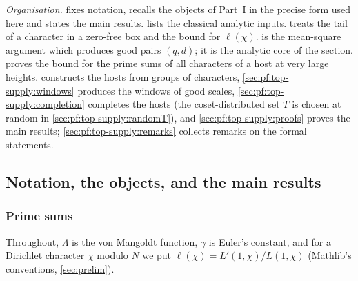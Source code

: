 \smallskip\noindent\emph{Organisation.}  fixes notation, recalls the objects of
Part~I in the precise form used here and states the main results.  lists the
classical analytic inputs.  treats the tail of a character in a zero-free box and the
bound for $\ell(\chi)$.  is the mean-square argument which produces good pairs
$(q,d)$; it is the analytic core of the section.  proves the bound for the prime sums
of all characters of a host at very large heights.  constructs the hosts from groups of
characters, \cref{sec:pf:top-supply:windows} produces the windows of good scales, \cref{sec:pf:top-supply:completion} completes
the hosts (the coset-distributed set $T$ is chosen at random in \cref{sec:pf:top-supply:randomT}), and
\cref{sec:pf:top-supply:proofs} proves the main results; \cref{sec:pf:top-supply:remarks} collects remarks on
the formal statements.

\subsection{Notation, the objects, and the main results}\label{sec:pf:top-supply:stmt}

\subsubsection{Prime sums}
Throughout, $\Lambda$ is the von Mangoldt function, $\gamma$ is Euler's constant, and for a Dirichlet character
$\chi$ modulo $N$ we put $\ell(\chi)=L'(1,\chi)/L(1,\chi)$ (Mathlib's conventions, \cref{sec:prelim}).

